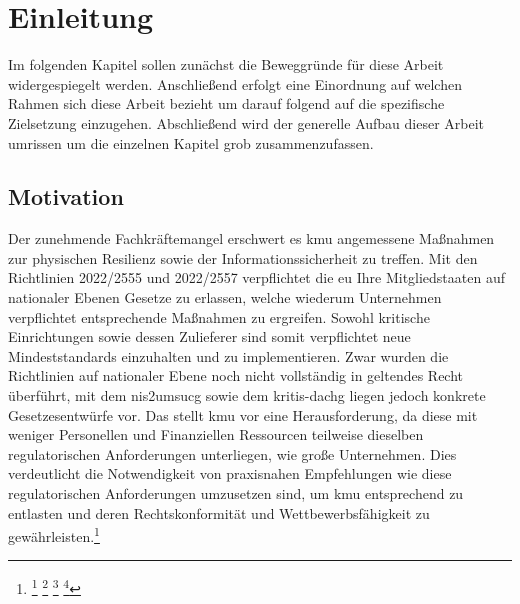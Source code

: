 \documentclass[11pt,a4paper,hidelinks]{article}   %
\begin{document}
    \clearpage

    \newpage
    \tableofcontents
	\newpage
	\listoftables
	\newpage
    \printglossary[type=\acronymtype, title=Abkürzungsverzeichnis, toctitle=Abkürzungsverzeichnis]

    \newpage
    \section{Einleitung}
    Im folgenden Kapitel sollen zunächst die Beweggründe für diese Arbeit widergespiegelt werden. Anschließend erfolgt eine Einordnung auf welchen Rahmen sich diese Arbeit bezieht um darauf folgend auf die spezifische Zielsetzung einzugehen. Abschließend wird der generelle Aufbau dieser Arbeit umrissen um die einzelnen Kapitel grob zusammenzufassen.
    \subsection{Motivation}\label{sec:Einleitung_Motivation}
        Der zunehmende Fachkräftemangel erschwert es \gls{kmu} angemessene Maßnahmen zur physischen Resilienz sowie der Informationssicherheit zu treffen. Mit den Richtlinien 2022/2555 und 2022/2557 verpflichtet die \gls{eu} Ihre Mitgliedstaaten auf nationaler Ebenen Gesetze zu erlassen, welche wiederum Unternehmen verpflichtet entsprechende Maßnahmen zu ergreifen. Sowohl kritische Einrichtungen sowie dessen Zulieferer sind somit verpflichtet neue Mindeststandards einzuhalten und zu implementieren. Zwar wurden die Richtlinien auf nationaler Ebene noch nicht vollständig in geltendes Recht überführt, mit dem \gls{nis2umsucg} sowie dem \gls{kritis-dachg} liegen jedoch konkrete Gesetzesentwürfe vor. Das stellt \gls{kmu} vor eine Herausforderung, da diese mit weniger Personellen und Finanziellen Ressourcen teilweise dieselben regulatorischen Anforderungen unterliegen, wie große Unternehmen. Dies verdeutlicht die Notwendigkeit von praxisnahen Empfehlungen wie diese regulatorischen Anforderungen umzusetzen sind, um \gls{kmu} entsprechend zu entlasten und deren Rechtskonformität und Wettbewerbsfähigkeit zu gewährleisten.\footnote{
            \footcite[Vgl.][S. 1]{destatis_kmu_beschaeftigte_2022}
            \footcite[Vgl.][S. 10]{dsin_sicherheitsindex_2023}
            \footcite[Vgl.][S. 1 - 2]{bitkom_fachkraeftemangel_2024}
            \footcite[Vgl.][S. 1]{bitkom_fachkraeftemangel_2024}
        }
\end{document}
